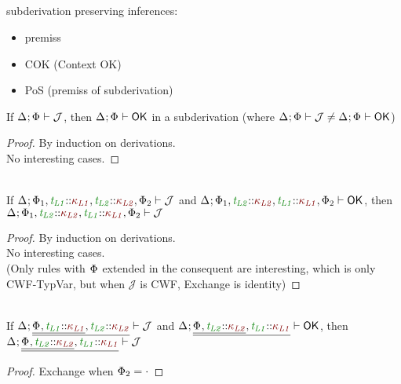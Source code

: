 \documentclass[11pt]{article}
\begin{document}
    \subsection*{}
    subderivation preserving inferences:
    \begin{itemize}
        \item premiss
        \item COK (Context OK)
        \item PoS (premiss of subderivation)
    \end{itemize}
    \begin{lemma}[COK]
        If $\J$, then $\ContextWellFormed$ in a subderivation (where $\J\neq\ContextWellFormed$)
    \end{lemma}
    \begin{proof}
        By induction on derivations. \\
        No interesting cases.
    \end{proof}
    \noindent\hrulefill
    \begin{lemma}[Exchange]
        \vphantom{.}\\
        If $\J[\HoleCtx\TypVarCtx[][1],\typvar[L1]\KndAssump\knd[L1],\typvar[L2]\KndAssump\knd[L2],\TypVarCtx[][2]]$ and $\ContextWellFormed[\HoleCtx\TypVarCtx[][1],\typvar[L2]\KndAssump\knd[L2],\typvar[L1]\KndAssump\knd[L1],\TypVarCtx[][2]]$, then $\J[\HoleCtx\TypVarCtx[][1],\typvar[L2]\KndAssump\knd[L2],\typvar[L1]\KndAssump\knd[L1],\TypVarCtx[][2]]$
    \end{lemma}
    \begin{proof}
        By induction on derivations. \\
        No interesting cases. \\
        (Only rules with $\TypVarCtx$ extended in the consequent are interesting, which is only CWF-TypVar, but when $\mathcal{J}$ is CWF, Exchange is identity)
    \end{proof}
    \begin{corollary}
        \vphantom{.}\\
        If $\J[\HoleCtx\xxExtendTypVarCtx[][L1]{\knd[L1]}[L2]{\knd[L2]}]$ and $\ContextWellFormed[\HoleCtx\xxExtendTypVarCtx[][L2]{\knd[L2]}[L1]{\knd[L1]}]$, then $\J[\HoleCtx\xxExtendTypVarCtx[][L2]{\knd[L2]}[L1]{\knd[L1]}]$
    \end{corollary}
    \begin{proof}
        Exchange when $\TypVarCtx[][2]=\cdot$
    \end{proof}
    \noindent\hrulefill
\end{document}
